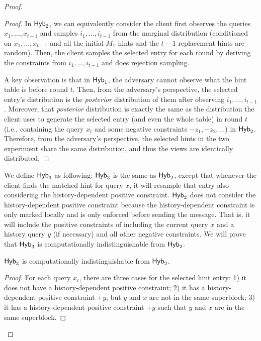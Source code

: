 \begin{proof}
\begin{proof}
        In ${\sf Hyb}_2$, we can equivalently consider the client first observes the queries $x_1,\dots,x_{t-1}$ and samples $i_1,\dots,i_{t-1}$ from the marginal distribution (conditioned on $x_1,\dots,x_{t-1}$ and all the initial $M_1$ hints and the $t-1$ replacement hints are random).
        Then, the client samples the selected entry for each round by deriving the constraints from $i_1,\dots,i_{t-1}$ and does rejection sampling.
        
        A key observation is that in ${\sf Hyb}_1$, the adversary cannot observe what the  hint table is before round $t$. 
        Then, from the adversary's perspective, the selected entry's distribution is the \textit{posterior} distribution of them after observing $i_1,\dots,i_{t-1}$. 
        Moreover, that \textit{posterior} distribution is exactly the same as the distribution the client uses to generate the selected entry (and even the whole table) in round $t$ (i.e., containing the query $x_t$ and some negative constraints $-z_1,-z_2,\dots$) in ${\sf Hyb}_2$.
        Therefore, from the adversary's perspective, the selected hints in the two experiment share the same distribution, and thus the views are identically distributed.
        
       
    \end{proof}
    
    
    We define ${\sf Hyb}_3$ as following: ${\sf Hyb}_3$ is the same as ${\sf Hyb}_2$, except that whenever the client finds the matched hint for query $x$, it will resample that entry also considering the history-dependent positive constraint. ${\sf Hyb}_2$ does not consider the history-dependent positive constraint because the history-dependent constraint is only marked locally and is only enforced before sending the message. That is, it will include the positive constraints of including the current query $x$ and a history query $y$ (if necessary) and all other negative constraints.
    We will prove that ${\sf Hyb}_3$ is computationally indistinguishable from ${\sf Hyb}_2$. 
    
    \begin{myclaim}
        ${\sf Hyb}_3$ is computationally indistinguishable from ${\sf Hyb}_2$.
    \end{myclaim}
    
    \begin{proof}
    
    For each query $x_t$, there are three cases for the selected hint entry: 1) it does not have a history-dependent positive constraint; 2) it has a history-dependent positive constraint $+y$, but $y$ and $x$ are not in the same superblock; 
    3) it has a history-dependent positive constraint $+y$ such that $y$ and $x$ are in the same superblock.
    

\end{proof}
\end{proof}
